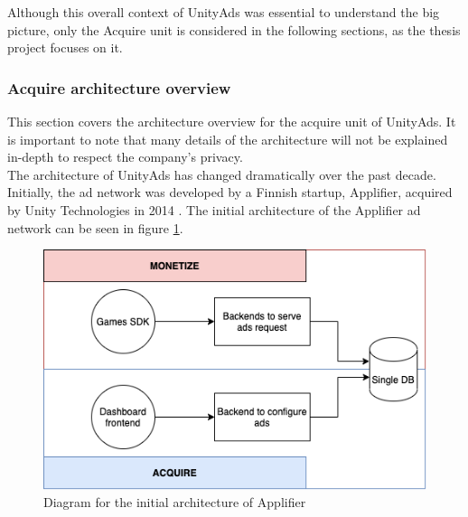 \documentclass[english, 12pt, a4paper, sci, utf8, a-1b, online]{aaltothesis}
\begin{document}
Although this overall context of UnityAds was essential to understand the big picture, only the Acquire unit is considered in the following sections, as the thesis project focuses on it.

\subsubsection{Acquire architecture overview}
\label{sec:acquire-architecture}

This section covers the architecture overview for the acquire unit of UnityAds. It is important to note that many details of the architecture will not be explained in-depth to respect the company's privacy.\\

The architecture of UnityAds has changed dramatically over the past decade. Initially, the ad network was developed by a Finnish startup, Applifier, acquired by Unity Technologies in 2014 \cite{UnityBuyApplifier}. The initial architecture of the Applifier ad network can be seen in figure \ref{fig:background:applifier-architecture}.

\begin{figure}[h]
    \centering
    \includegraphics[scale=0.4]{src/thesis/img/background/applifier-unityads-architecture.png}
    \caption{Diagram for the initial architecture of Applifier}
    \label{fig:background:applifier-architecture}
\end{figure}
\end{document}

